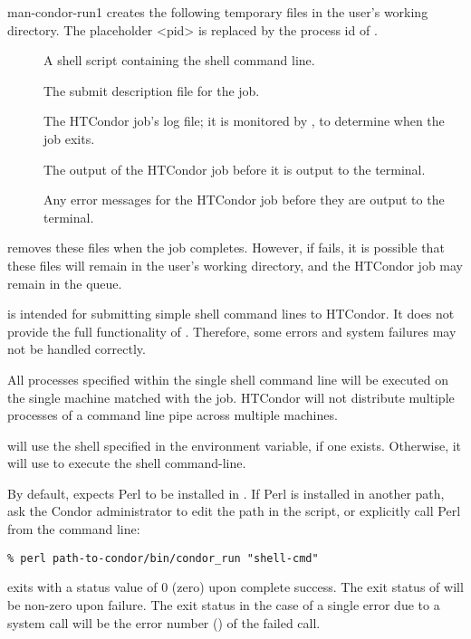 \begin{ManPage}{}{man-condor-run}{1}
 creates the following temporary files in the user's
working directory.
The placeholder <pid> is replaced by the process id
of .
\begin{description}
\item[] A shell script containing the shell
  command line.
\item[] The submit description file for
  the job.
\item[] The HTCondor job's log file; it is
  monitored by , to determine when the job exits.
\item[] The output of the HTCondor
  job before it is output to the terminal.
\item[] Any error messages for the HTCondor
  job  before they are output to the terminal.
\end{description}
 removes these files when the job completes.  However, if
 fails, it is possible that these files will remain in the
user's working directory, and the HTCondor job may remain in the queue.

\GenRem

 is intended for submitting simple shell command lines to
HTCondor.  It does not provide the full functionality of
.  Therefore, some  errors and
system failures may not be handled correctly. 

All processes specified within the single shell command line
will be executed on the single machine
matched with the job.  HTCondor will not distribute multiple
processes of a command line pipe across multiple machines.

 will use the shell specified in the  environment
variable, if one exists.  Otherwise, it will use  to execute
the shell command-line.

By default,  expects Perl to be installed in
.  If Perl is installed in another path, 
ask the Condor administrator to edit the path in the 
script, or explicitly call Perl from the command line:

\begin{verbatim}
% perl path-to-condor/bin/condor_run "shell-cmd"
\end{verbatim}


\ExitStatus

 exits with a status value of 0 (zero) upon complete success.
The exit status of  will be non-zero upon failure.
The exit status in the case of a single error due to a system call
will be the error number () of the failed call.

\end{ManPage}
